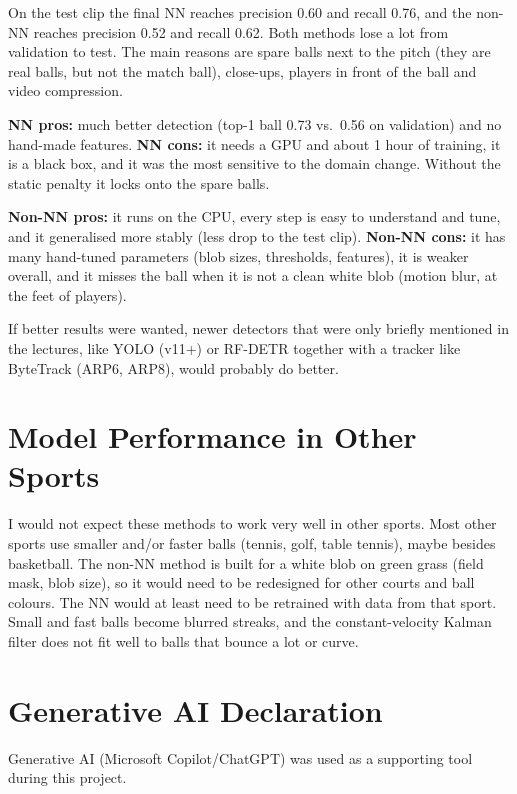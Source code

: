 \documentclass[12pt]{article}
\begin{document}
On the test clip the final NN reaches precision 0.60 and recall 0.76, and the non-NN reaches precision 0.52 and recall 0.62. Both methods lose a lot from validation to test. The main reasons are spare balls next to the pitch (they are real balls, but not the match ball), close-ups, players in front of the ball and video compression.

\textbf{NN pros:} much better detection (top-1 ball 0.73 vs.\ 0.56 on validation) and no hand-made features. \textbf{NN cons:} it needs a GPU and about 1 hour of training, it is a black box, and it was the most sensitive to the domain change. Without the static penalty it locks onto the spare balls.

\textbf{Non-NN pros:} it runs on the CPU, every step is easy to understand and tune, and it generalised more stably (less drop to the test clip). \textbf{Non-NN cons:} it has many hand-tuned parameters (blob sizes, thresholds, features), it is weaker overall, and it misses the ball when it is not a clean white blob (motion blur, at the feet of players).

If better results were wanted, newer detectors that were only briefly mentioned in the lectures, like YOLO (v11+) or RF-DETR together with a tracker like ByteTrack (ARP6, ARP8), would probably do better.

\section{Model Performance in Other Sports}
I would not expect these methods to work very well in other sports. Most other sports use smaller and/or faster balls (tennis, golf, table tennis), maybe besides basketball. The non-NN method is built for a white blob on green grass (field mask, blob size), so it would need to be redesigned for other courts and ball colours. The NN would at least need to be retrained with data from that sport. Small and fast balls become blurred streaks, and the constant-velocity Kalman filter does not fit well to balls that bounce a lot or curve.

\section{Generative AI Declaration}

Generative AI (Microsoft Copilot/ChatGPT) was used as a supporting tool during this project.
\end{document}
